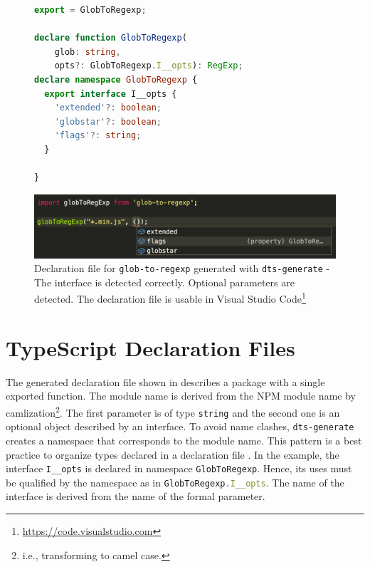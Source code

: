 \documentclass[sigconf]{acmart}
\begin{document}
\begin{figure}[tp]
  \centering
    \begin{lstlisting}[language=TypeScript,numbers=none]
export = GlobToRegexp;

declare function GlobToRegexp(
    glob: string, 
    opts?: GlobToRegexp.I__opts): RegExp;
declare namespace GlobToRegexp {
  export interface I__opts {
    'extended'?: boolean;
    'globstar'?: boolean;
    'flags'?: string;
  }

}
    \end{lstlisting}
  \begin{center}
    \includegraphics[width=\linewidth]{motivating-example-glob-to-regexp-vscode.png}
  \end{center}

  \caption{Declaration file for \texttt{glob-to-regexp} 
    generated with \texttt{dts-generate} - The interface is
    detected correctly. Optional parameters are detected. The declaration 
    file is usable in Visual Studio Code\protect\footnote{\url{https://code.visualstudio.com}}} 
  \label{fig:motivating-example-glob-to-regexp-vscode}
\end{figure}


\section{TypeScript Declaration Files}
\label{sec:typescr-decl-files}

The generated declaration file shown in 
describes a package with a single exported function. The module name
is derived from the NPM module name by camlization\footnote{i.e.,
  transforming to camel case.}. The first parameter is of type
\texttt{string} and the second one is an optional object described by
an interface. To avoid name clashes, \texttt{dts-generate} creates a
namespace that corresponds to the module name. This pattern is a best
practice to  organize types declared in a declaration file
\cite{typescript-namespaces}. In the example, the interface
\lstinline[language=TypeScript]{I__opts} is declared in namespace
\lstinline[language=TypeScript]{GlobToRegexp}. Hence, its uses
must be qualified by the namespace as in
\lstinline[language=TypeScript]{GlobToRegexp.I__opts}. The name of the
interface is derived from the name of the formal parameter. 
\end{document}
